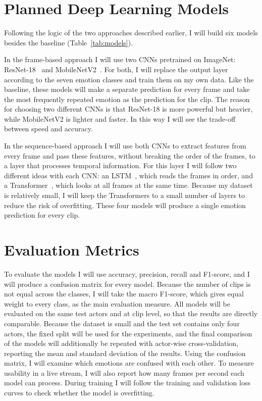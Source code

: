 \documentclass[10pt,a4paper,twocolumn]{article}
\begin{document}
\section{Planned Deep Learning Models}
Following the logic of the two approaches described earlier, I will build six models besides the baseline (Table~\ref{tab:models}).

In the frame-based approach I will use two CNNs pretrained on ImageNet: ResNet-18~\cite{resnet} and MobileNetV2~\cite{mobilenetv2}. For both, I will replace the output layer according to the seven emotion classes and train them on my own data. Like the baseline, these models will make a separate prediction for every frame and take the most frequently repeated emotion as the prediction for the clip. The reason for choosing two different CNNs is that ResNet-18 is more powerful but heavier, while MobileNetV2 is lighter and faster. In this way I will see the trade-off between speed and accuracy.

In the sequence-based approach I will use both CNNs to extract features from every frame and pass these features, without breaking the order of the frames, to a layer that processes temporal information. For this layer I will follow two different ideas with each CNN: an LSTM~\cite{lstm}, which reads the frames in order, and a Transformer~\cite{transformer}, which looks at all frames at the same time. Because my dataset is relatively small, I will keep the Transformers to a small number of layers to reduce the risk of overfitting. These four models will produce a single emotion prediction for every clip.

\section{Evaluation Metrics}
To evaluate the models I will use accuracy, precision, recall and F1-score, and I will produce a confusion matrix for every model. Because the number of clips is not equal across the classes, I will take the macro F1-score, which gives equal weight to every class, as the main evaluation measure. All models will be evaluated on the same test actors and at clip level, so that the results are directly comparable. Because the dataset is small and the test set contains only four actors, the fixed split will be used for the experiments, and the final comparison of the models will additionally be repeated with actor-wise cross-validation, reporting the mean and standard deviation of the results. Using the confusion matrix, I will examine which emotions are confused with each other. To measure usability in a live stream, I will also report how many frames per second each model can process. During training I will follow the training and validation loss curves to check whether the model is overfitting.
\end{document}
